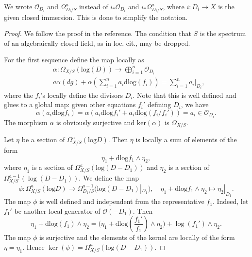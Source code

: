 \documentclass[10pt,a4paper]{amsart}
\newcommand\dlog{\mathrm{dlog}}
\newcommand\llog{\mathrm{log}}
\begin{document}
\begin{remark}
	We wrote $\mathcal{O}_{D_i}$ and $\Omega_{D_i/S}^{a}$ instead of $i_*\mathcal{O}_{D_i}$ and $i_*\Omega_{D_i/S}^{a}$, where $i:D_i\to X$ is the given closed immersion. This is done to simplify the notation.
\end{remark}

\begin{proof}
	We follow the proof in the reference. The condition that $S$ is the spectrum of an algebraically closed field, as in loc. cit., may be dropped.	

	For the first sequence define the map locally as 
	\begin{align*}
			&\alpha:\Omega_{X/S}(\textrm{log}(D))\to \bigoplus_{i=1}^n\mathcal{O}_{D_i}	\\
			 &a\alpha(dg)+\alpha(\sum_{i=1}^{n}a_i\dlog  (f_i))=\sum_{i=1}^na_i|_{D_i},
\end{align*}	
	where the $f_i$'s locally define the divisors $D_i$. Note that this is well defined and glues to a global map: given other equations $f_i'$ defining $D_i$, we have $$\alpha(a_i\dlog   f_i)=\alpha(a_i \dlog  f_i'+a_i\dlog (f_i/f_i'))=a_i\in \mathcal{O}_{D_i}.$$
	The morphism $\alpha$ is obviously surjective and $\textrm{ker}(\alpha)$ is $\Omega_{X/S}$.
	
	Let $\eta$ be a section of $\Omega_{X/S}^a(\llog D)$. Then $\eta$ is locally a sum of elements of the form 
	\[
	\eta_1 + \dlog   f_1\wedge \eta_2,
	\]
	where $\eta_1$ is a section of  $\Omega_{X/S}^a(\llog (D- D_1))$ and $\eta_2$ is a section of $\Omega_{X/S}^{a-1}(\log (D-D_1))$. We define the map
	\[
	\phi:\Omega_{X/S}^a(\llog D)\to \Omega^{a-1}_{D_1/S}(\llog(D-D_1)|_{D_1}), \quad \eta_1 + \dlog   f_1 \wedge \eta_2 \mapsto \eta_2|_{D_1}.
	\]
	 The map $\phi$ is well defined and independent from the representative $f_1$. Indeed, let $f_1'$ be another local generator of $\mathcal{O}(-D_1)$. Then 
	 \[
	 \eta_1+\dlog  (f_1)\wedge \eta_2= \big(\eta_1+\dlog  (\frac{f_1'}{f_1})\wedge \eta_2 \big)+ \log (f_1')\wedge \eta_2.
	 \]
	  The map $\phi$ is surjective and the elements of the kernel are locally of the form $\eta=\eta_1$. Hence $\ker(\phi)=\Omega_{X/S}^a(\llog( D-D_1))$.
	
\end{proof}
\end{document}
